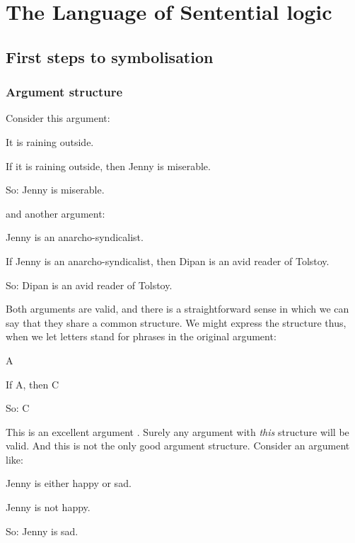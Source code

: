 \part{The Language of Sentential logic}
\label{ch.TFL}

\chapter{First steps to symbolisation}\label{s:firststeps}

\section{Argument structure}\label{s:ValidityInVirtueOfForm}
Consider this argument:
	\begin{earg}
		\item[] It is raining outside.
		\item[] \textsf{If} it is raining outside, \textsf{then} Jenny is miserable.
		\item[So:] Jenny is miserable.
	\end{earg}
and another argument:
	\begin{earg}
		\item[] Jenny is an anarcho-syndicalist.
		\item[] \textsf{If} Jenny is an anarcho-syndicalist, \textsf{then} Dipan is an avid reader of Tolstoy.
		\item[So:] Dipan is an avid reader of Tolstoy.
	\end{earg}
Both arguments are valid, and there is a straightforward sense in which we can say that they share a common structure. We might express the structure thus, when we let letters stand for phrases in the original argument:
	\begin{earg}
		\item[] A
		\item[] \textsf{If} A, \textsf{then} C
		\item[So:] C
	\end{earg}
This is an excellent argument . Surely any argument with \emph{this} structure will be valid. And this is not the only good argument structure. Consider an argument like:
	\begin{earg}
		\item[] Jenny is \textsf{either} happy \textsf{or} sad.
		\item[] Jenny is \textsf{not} happy.
		\item[So:] Jenny is sad.
	\end{earg}
